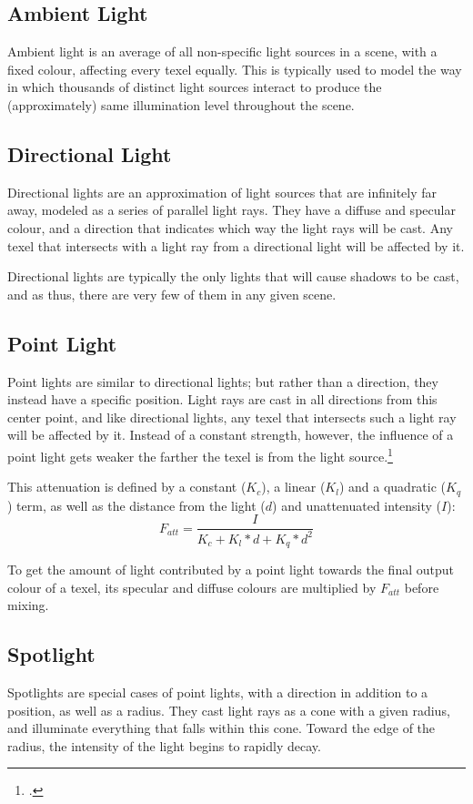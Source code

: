 \documentclass[11pt, oneside]{report}
\begin{document}
\subsection{Ambient Light}
Ambient light is an average of all non-specific light sources in a scene, with a fixed colour, affecting every \gls{texel} equally. This is typically used to model the way in which thousands of distinct light sources interact to produce the (approximately) same illumination level throughout the scene.

\subsection{Directional Light}
Directional lights are an approximation of light sources that are infinitely far away, modeled as a series of parallel light rays. They have a diffuse and specular colour, and a direction that indicates which way the light rays will be cast. Any \gls{texel} that intersects with a light ray from a directional light will be affected by it.

Directional lights are typically the only lights that will cause shadows to be cast, and as thus, there are very few of them in any given scene.

\subsection{Point Light}
Point lights are similar to directional lights; but rather than a direction, they instead have a specific position. Light rays are cast in all directions from this center point, and like directional lights, any \gls{texel} that intersects such a light ray will be affected by it. Instead of a constant strength, however, the influence of a point light gets weaker the farther the \gls{texel} is from the light source.\footcite{pointlight-attenuate}	

This attenuation is defined by a constant ($K_c$), a linear ($K_l$) and a quadratic ($K_q$) term, as well as the distance from the light ($d$) and unattenuated intensity ($I$): \begin{equation} F_{att} = \frac{I}{K_c + K_l * d + K_q * d^2} \end{equation}

To get the amount of light contributed by a point light towards the final output colour of a \gls{texel}, its specular and diffuse colours are multiplied by $F_{att}$ before mixing.

\subsection{Spotlight}
Spotlights are special cases of point lights, with a direction in addition to a position, as well as a radius. They cast light rays as a cone with a given radius, and illuminate everything that falls within this cone. Toward the edge of the radius, the intensity of the light begins to rapidly decay.
\end{document}
